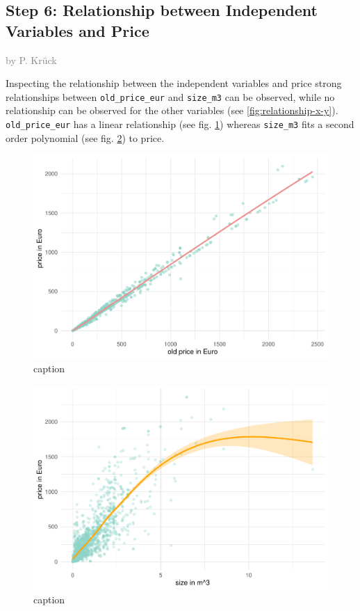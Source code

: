 \documentclass[a4paper, nobind]{templates/ociamthesis}
\begin{document}
\hypertarget{relationship}{%
\subsection{Step 6: Relationship between Independent Variables and Price}\label{relationship}}

\textcolor{gray}{by P. Krück}

Inspecting the relationship between the independent variables and price strong relationships between \texttt{old\_price\_eur} and \texttt{size\_m3} can be observed, while no relationship can be observed for the other variables (see \ref{fig:relationship-x-y}).
\texttt{old\_price\_eur} has a linear relationship (see fig. \ref{fig:relationship-old-price}) whereas \texttt{size\_m3} fits a second order polynomial (see fig. \ref{fig:relationship-size-m3}) to price.

\begin{figure}
\includegraphics[width=1\linewidth]{_main_files/figure-latex/relationship-old-price-1} \caption{caption}\label{fig:relationship-old-price}
\end{figure}

\begin{figure}
\includegraphics[width=1\linewidth]{_main_files/figure-latex/relationship-size-m3-1} \caption{caption}\label{fig:relationship-size-m3}
\end{figure}
\end{document}
